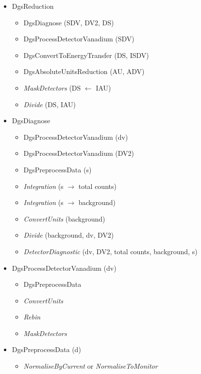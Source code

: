 \begin{itemize}
\item DgsReduction
\begin{itemize}
\item DgsDiagnose (SDV, DV2, DS)
\item DgsProcessDetectorVanadium (SDV)
\item DgsConvertToEnergyTransfer (DS, ISDV)
\item DgsAbsoluteUnitsReduction (AU, ADV)
\item \textit{MaskDetectors} (DS $\leftarrow$ IAU)
\item \textit{Divide} (DS, IAU)
\end{itemize}
\end{itemize}

\begin{itemize}
\item DgsDiagnose
\begin{itemize}
\item DgsProcessDetectorVanadium (dv)
\item DgsProcessDetectorVanadium (DV2)
\item DgsPreprocessData (s)
\item \textit{Integration} (s $\rightarrow$ total counts)
\item \textit{Integration} (s $\rightarrow$ background)
\item \textit{ConvertUnits} (background)
\item \textit{Divide} (background, dv, DV2)
\item \textit{DetectorDiagnostic} (dv, DV2, total counts, background, s)
\end{itemize}
\end{itemize}

\begin{itemize}
\item DgsProcessDetectorVanadium (dv)
\begin{itemize}
\item DgsPreprocessData
\item \textit{ConvertUnits}
\item \textit{Rebin} 
\item \textit{MaskDetectors}
\end{itemize}
\end{itemize}

\begin{itemize}
\item DgsPreprocessData (d)
\begin{itemize}
\item \textit{NormaliseByCurrent} or \textit{NormaliseToMonitor}
\end{itemize}
\end{itemize}

